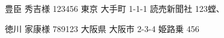 \documentclass[]{jletteraddress}
\begin{document}
\addaddress
    {豊臣 秀吉}{様}
    {123456}
    {東京 大手町 1-1-1}
    {読売新聞社 123螳､}

\addaddress
    {徳川 家康}{様}
    {789123}
    {大阪県 大阪市 2-3-4}
    {姫路乗 456}
\end{document}
